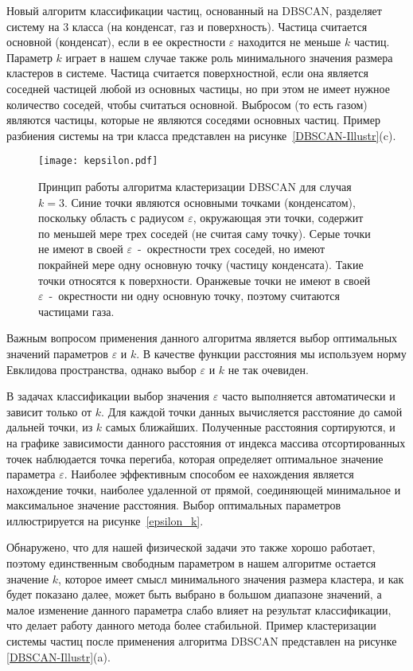 Новый алгоритм классификации частиц, основанный на DBSCAN, разделяет систему на 3 класса (на конденсат, газ и поверхность).
Частица считается основной (конденсат), если в ее окрестности $\varepsilon$ находится не меньше $k$ частиц.
Параметр $k$ играет в нашем случае также роль минимального значения размера кластеров в системе.
Частица считается поверхностной, если она является соседней частицей любой из основных частицы, но при этом не имеет нужное количество соседей, чтобы считаться основной.
Выбросом (то есть газом) являются частицы, которые не являются соседями основных частиц. Пример разбиения системы на три класса представлен на рисунке~\ref{DBSCAN-Illustr}(c).

\begin{figure}[!t]
    \centering
    \texttt{[image: kepsilon.pdf]}
    \caption{Принцип работы алгоритма кластеризации DBSCAN для случая $k = 3$. Синие точки являются основными точками (конденсатом), поскольку область с радиусом $\varepsilon$, окружающая эти точки, содержит по меньшей мере трех соседей (не считая саму точку).
    Серые точки не имеют в своей $\varepsilon$~-~окрестности трех соседей, но имеют покрайней мере одну основную точку (частицу конденсата).
    Такие точки относятся к поверхности.
    Оранжевые точки не имеют в своей $\varepsilon$~-~окрестности ни одну основную точку, поэтому считаются частицами газа.}
    \label{kepsilon}
\end{figure}

Важным вопросом применения данного алгоритма является выбор оптимальных значений параметров $\varepsilon$ и $k$.
В качестве функции расстояния мы используем норму Евклидова пространства, однако выбор $\varepsilon$ и $k$ не так очевиден.

В задачах классификации выбор значения $\varepsilon$ часто выполняется автоматически и зависит только от $k$.
Для каждой точки данных вычисляется расстояние до самой дальней точки, из $k$ самых ближайших.
Полученные расстояния сортируются, и на графике зависимости данного расстояния от индекса массива отсортированных точек наблюдается точка перегиба, которая определяет оптимальное значение параметра $\varepsilon$.
Наиболее эффективным способом ее нахождения является нахождение точки, наиболее удаленной от прямой, соединяющей минимальное и максимальное значение расстояния.
Выбор оптимальных параметров иллюстрируется на рисунке~\ref{epsilon_k}.

Обнаружено, что для нашей физической задачи это также хорошо работает, поэтому единственным свободным параметром в нашем алгоритме остается значение $k$, которое имеет смысл минимального значения размера кластера, и как будет показано далее, может быть выбрано в большом диапазоне значений, а малое изменение данного параметра слабо влияет на результат классификации, что делает работу данного метода более стабильной.
Пример кластеризации системы частиц после применения алгоритма DBSCAN представлен на рисунке \ref{DBSCAN-Illustr}(a).

